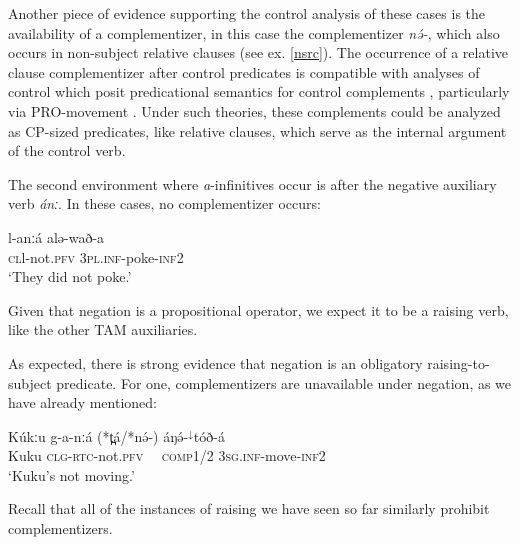  \label{ex:ch15:touched}
 \label{ex:ch15:shot}
\z 
\z 

Another piece of evidence supporting the control analysis of these cases is the availability of a complementizer, in this case the complementizer \textit{nə́-}, which also occurs in non-subject relative clauses (see ex. \ref{nsrc}). The occurrence of a relative clause complementizer after control predicates is compatible with analyses of control which posit predicational semantics for control complements \citep{wil80,chierch84}, particularly via PRO-movement  \citep{clark90}. Under such theories, these complements could be analyzed as CP-sized predicates, like relative clauses, which serve as the internal argument of the control verb.

The second environment where \textit{a}-infinitives occur is after the negative auxiliary verb \textit{ánː}. In these cases, no complementizer occurs:

\ea \gll 	l-anːá               alə-wað-a	\\
\textsc{cl}l-not.\textsc{pfv}   \textsc{3pl.inf}-poke-\textsc{inf2}\\
\glt ‘They did not poke.’ \label{ex:ch15:poke}
\z 

Given that negation is a propositional operator, we expect it to be a raising verb, like the other TAM auxiliaries. 

As expected, there is strong evidence that negation is an obligatory raising-to-subject predicate. For one, complementizers are unavailable under negation, as we have already mentioned: 

\ea \gll Kúkːu g-a-nːá (*t̪á/*nə́-) áŋə́-$^{↓}$tóð-á\\
Kuku \textsc{clg}-\textsc{rtc}-not.\textsc{pfv}   {\ \ \textsc{comp1/2}} \textsc{3sg.inf}-move-\textsc{inf2}\\
\glt ‘Kuku’s not moving.’
\z 

Recall that all of the instances of raising we have seen so far similarly prohibit complementizers.

